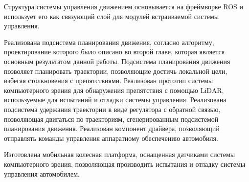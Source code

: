 Структура системы управления движением основывается на фреймворке ROS и использует его как связующий слой для модулей
встраиваемой системы управления.

Реализована подсистема планирования движения, согласно алгоритму, проектирование которого было описано во второй главе,
которая является основным результатом данной работы. Подсистема планирования движения позволяет планировать траектории,
позволяющие достичь локальной цели, избегая столкновения с препятствиями.
Реализован прототип системы компьютерного зрения для обнаружения препятствия с помощью LiDAR, используемые для
испытаний и отладки системы управления. Реализована подсистема удержания траектории в виде регулятора с обратной связью,
позволяющая двигаться по траекториям, сгенерированным подсистемой планирования движения. Реализован компонент
драйвера, позволяющий отправлять команды управления аппаратному обеспечению автомобиля.

Изготовлена мобильная колесная платформа, оснащенная датчиками системы компьютерного зрения, позволяющая производить
испытания и отладку системы управления автомобилем.